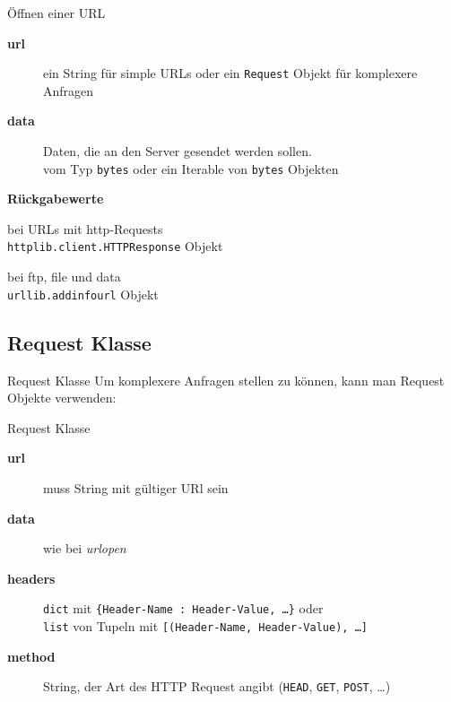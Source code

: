 \begin{frame}[fragile]{Öffnen einer URL}
	\begin{description}
		\item[\textbf{url}] ein String für simple URLs oder ein \texttt{Request} Objekt für komplexere Anfragen
		\item[\textbf{data}] Daten, die an den Server gesendet werden sollen. \\
		vom Typ \texttt{bytes} oder ein Iterable von \texttt{bytes} Objekten \\[.75cm]
	\end{description}
	\textbf{Rückgabewerte}
	\begin{description}
		\item bei URLs mit http-Requests \\
		\hspace*{1cm}\texttt{httplib.client.HTTPResponse} Objekt
		\item bei ftp, file und data \\
		\hspace*{1cm}\texttt{urllib.addinfourl} Objekt
	\end{description}
\end{frame}

\subsection{Request Klasse}
\begin{frame}{Request Klasse}
	Um komplexere Anfragen stellen zu können, kann man Request Objekte verwenden:
	
\end{frame}

\begin{frame}{Request Klasse}
	\begin{description}
		\item[\textbf{url}] muss String mit gültiger URl sein
		\item[\textbf{data}] wie bei \textit{urlopen}
		\item[\textbf{headers}] \texttt{dict} mit \texttt{\{Header-Name : Header-Value, \ldots\}} oder \\
		\texttt{list} von Tupeln mit \texttt{[(Header-Name, Header-Value), \ldots]}
		\item[\textbf{method}] String, der Art des HTTP Request angibt (\texttt{HEAD}, \texttt{GET}, \texttt{POST}, \ldots)
	\end{description}
\end{frame}

